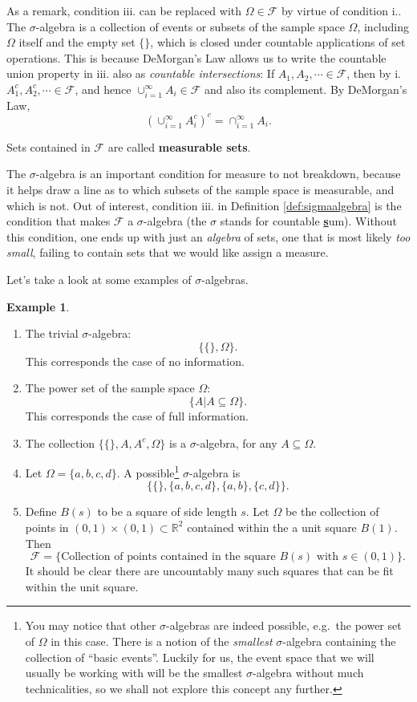 \documentclass[
]{book}
\newcommand{\bbR}{\mathbb{R}}
\newcommand{\cF}{{\mathcal F}}
\theoremstyle{definition}
\theoremstyle{definition}
\newtheorem{example}{Example}[chapter]
\theoremstyle{definition}
\theoremstyle{definition}
\theoremstyle{remark}
\begin{document}
As a remark, condition iii. can be replaced with \(\Omega\in\cF\) by virtue of condition i..
The \(\sigma\)-algebra is a collection of events or subsets of the sample space \(\Omega\), including \(\Omega\) itself and the empty set \(\{\}\), which is closed under countable applications of set operations.
This is because DeMorgan's Law allows us to write the countable union property in iii. also as \emph{countable intersections}: If \(A_1,A_2,\cdots \in \cF\), then by i. \(A_1^c,A_2^c,\cdots \in \cF\), and hence \(\cup_{i=1}^\infty A_i\in\cF\) and also its complement. By DeMorgan's Law,
\[
\left( \cup_{i=1}^\infty A_i^c \right)^c = \cap_{i=1}^\infty A_i.
\]

Sets contained in \(\cF\) are called \textbf{measurable sets}.

The \(\sigma\)-algebra is an important condition for measure to not breakdown, because it helps draw a line as to which subsets of the sample space is measurable, and which is not.
Out of interest, condition iii. in Definition \ref{def:sigmaalgebra} is the condition that makes \(\cF\) a \(\sigma\)-algebra (the \(\sigma\) stands for countable \uline{\textbf{s}}um).
Without this condition, one ends up with just an \emph{algebra} of sets, one that is most likely \emph{too small}, failing to contain sets that we would like assign a measure.

Let's take a look at some examples of \(\sigma\)-algebras.

\begin{example}

\begin{enumerate}
\def\labelenumi{\arabic{enumi}.}
\item
  The trivial \(\sigma\)-algebra: \[\big\{ \{\}, \Omega \big\}.\] This corresponds the case of no information.
\item
  The power set of the sample space \(\Omega\): \[\big\{ A | A \subseteq \Omega \big\}.\] This corresponds the case of full information.
\item
  The collection \(\big\{ \{\}, A, A^c, \Omega \big\}\) is a \(\sigma\)-algebra, for any \(A\subseteq \Omega\).
\item
  Let \(\Omega = \{a,b,c,d\}\). A possible\footnote{You may notice that other \(\sigma\)-algebras are indeed possible, e.g.~the power set of \(\Omega\) in this case. There is a notion of the \emph{smallest} \(\sigma\)-algebra containing the collection of ``basic events''. Luckily for us, the event space that we will usually be working with will be the smallest \(\sigma\)-algebra without much technicalities, so we shall not explore this concept any further.} \(\sigma\)-algebra is \[\big\{\{\}, \{a,b,c,d\}, \{a,b\}, \{c,d\} \big\}.\]
\item
  Define \(B(s)\) to be a square of side length \(s\). Let \(\Omega\) be the collection of points in \((0,1)\times(0,1)\subset \bbR^2\) contained within the a unit square \(B(1)\). Then \[\cF=\{ \text{Collection of points contained in the square } B(s) \text{ with } s \in (0,1) \}.\] It should be clear there are uncountably many such squares that can be fit within the unit square.
\end{enumerate}

\end{example}
\end{document}
